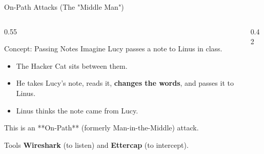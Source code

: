 \documentclass[aspectratio=169]{beamer}  %
\begin{document}
\begin{frame}{On-Path Attacks (The "Middle Man")}
    \begin{columns}[T]
        \begin{column}{0.55\textwidth}
            \begin{block}{Concept: Passing Notes}
                \footnotesize
                Imagine Lucy passes a note to Linus in class.
                \begin{itemize}
                    \item The Hacker Cat sits between them.
                    \item He takes Lucy's note, reads it, \textbf{changes the words}, and passes it to Linus.
                    \item Linus thinks the note came from Lucy.
                \end{itemize}
                This is an **On-Path** (formerly Man-in-the-Middle) attack.
            \end{block}
            \begin{exampleblock}{Tools}
                \footnotesize
                \textbf{Wireshark} (to listen) and \textbf{Ettercap} (to intercept).
            \end{exampleblock}
        \end{column}
        \begin{column}{0.42\textwidth}
            \begin{center}
            \end{center}
        \end{column}
    \end{columns}
\end{frame}
\end{document}
